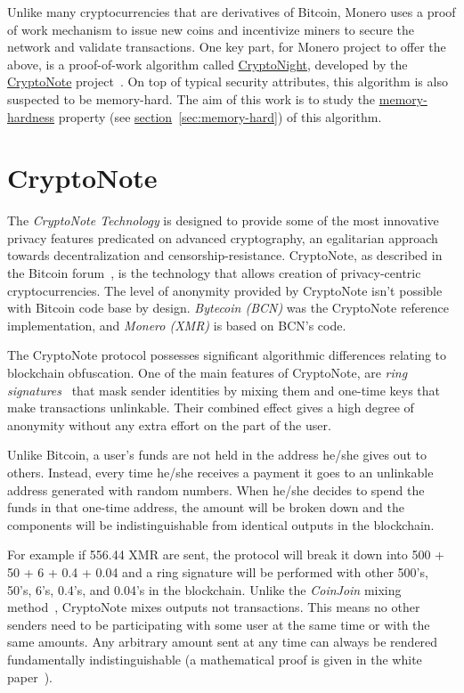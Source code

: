 Unlike many cryptocurrencies that are derivatives of Bitcoin, Monero uses a proof of work mechanism to issue new coins and incentivize miners to secure the network and validate transactions. One key part, for Monero project to offer the above, is a proof-of-work algorithm called \hyperref[ch:cryptonight]{CryptoNight}, developed by the \hyperref[sec:CryptoNote]{CryptoNote} project~\cite{citeulike:14139412}. On top of typical security attributes, this algorithm is also suspected to be memory-hard. The aim of this work is to study the \hyperref[sec:memory-hard]{memory-hardness} property (see \hyperref[sec:memory-hard]{section}~\ref{sec:memory-hard}) of this algorithm.
\clearpage
\pagebreak

\section{CryptoNote} \label{sec:CryptoNote}
The \emph{CryptoNote Technology} is designed to provide some of the most innovative privacy features predicated on advanced cryptography, an egalitarian approach towards decentralization and censorship-resistance. CryptoNote, as described in the Bitcoin forum~\cite{btcforum}, is the technology that allows creation of privacy-centric cryptocurrencies. The level of anonymity provided by CryptoNote isn't possible with Bitcoin code base by design. \emph{Bytecoin (BCN)} was the CryptoNote reference implementation, and \emph{Monero (XMR)} is based on BCN's code.

The CryptoNote protocol possesses significant algorithmic differences relating to blockchain obfuscation. One of the main features of CryptoNote, are \emph{ring signatures}~\cite{citeulike:14139412} that mask sender identities by mixing them and one-time keys that make transactions unlinkable. Their combined effect gives a high degree of anonymity without any extra effort on the part of the user.

Unlike Bitcoin, a user's funds are not held in the address he/she gives out to others. Instead, every time he/she receives a payment it goes to an unlinkable address generated with random numbers. When he/she decides to spend the funds in that one-time address, the amount will be broken down and the components will be indistinguishable from identical outputs in the blockchain.

For example if 556.44 XMR are sent, the protocol will break it down into 500 + 50 + 6 + 0.4 + 0.04 and a ring signature will be performed with other 500's, 50's, 6's, 0.4's, and 0.04's in the blockchain. Unlike the \emph{CoinJoin} mixing method~\cite{btcforum}, CryptoNote mixes outputs not transactions. This means no other senders need to be participating with some user at the same time or with the same amounts. Any arbitrary amount sent at any time can always be rendered fundamentally indistinguishable (a mathematical proof is given in the white paper~\cite{citeulike:14139412}).

